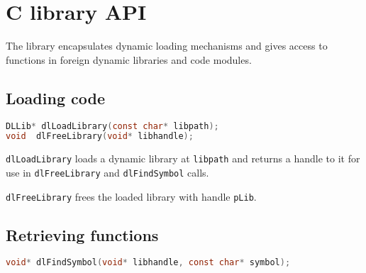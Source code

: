 %
%
%
%

\newpage
\section{ C library API}

The  library encapsulates dynamic loading mechanisms and
gives access to functions in foreign dynamic libraries and code modules.

\subsection{Loading code}

\begin{lstlisting}[language=c,label=dl-load]
DLLib* dlLoadLibrary(const char* libpath);
void  dlFreeLibrary(void* libhandle);
\end{lstlisting}

\lstinline{dlLoadLibrary} loads a dynamic library at \lstinline{libpath}
and returns a handle to it for use in \lstinline{dlFreeLibrary} and
\lstinline{dlFindSymbol} calls.

\lstinline{dlFreeLibrary} frees the loaded library with handle \lstinline{pLib}.

\subsection{Retrieving functions}

\begin{lstlisting}[language=c]
void* dlFindSymbol(void* libhandle, const char* symbol);
\end{lstlisting}

